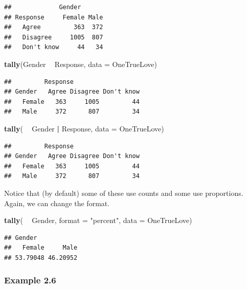 \documentclass[]{book}
\newenvironment{Shaded}{\begin{snugshade}}{\end{snugshade}}
\newcommand{\DataTypeTok}[1]{\textcolor[rgb]{0.13,0.29,0.53}{#1}}
\newcommand{\KeywordTok}[1]{\textcolor[rgb]{0.13,0.29,0.53}{\textbf{#1}}}
\newcommand{\NormalTok}[1]{#1}
\newcommand{\OperatorTok}[1]{\textcolor[rgb]{0.81,0.36,0.00}{\textbf{#1}}}
\newcommand{\StringTok}[1]{\textcolor[rgb]{0.31,0.60,0.02}{#1}}
\begin{document}
\begin{verbatim}
##             Gender
## Response     Female Male
##   Agree         363  372
##   Disagree     1005  807
##   Don't know     44   34
\end{verbatim}

\begin{Shaded}
\begin{Highlighting}[]
\KeywordTok{tally}\NormalTok{(Gender }\OperatorTok{~}\StringTok{ }\NormalTok{Response, }\DataTypeTok{data =}\NormalTok{ OneTrueLove)}
\end{Highlighting}
\end{Shaded}

\begin{verbatim}
##         Response
## Gender   Agree Disagree Don't know
##   Female   363     1005         44
##   Male     372      807         34
\end{verbatim}

\begin{Shaded}
\begin{Highlighting}[]
\KeywordTok{tally}\NormalTok{( }\OperatorTok{~}\StringTok{ }\NormalTok{Gender }\OperatorTok{|}\StringTok{ }\NormalTok{Response, }\DataTypeTok{data =}\NormalTok{ OneTrueLove)}
\end{Highlighting}
\end{Shaded}

\begin{verbatim}
##         Response
## Gender   Agree Disagree Don't know
##   Female   363     1005         44
##   Male     372      807         34
\end{verbatim}

Notice that (by default) some of these use counts and some use proportions. Again, we can change the format.

\begin{Shaded}
\begin{Highlighting}[]
\KeywordTok{tally}\NormalTok{( }\OperatorTok{~}\StringTok{ }\NormalTok{Gender, }\DataTypeTok{format =} \StringTok{"percent"}\NormalTok{, }\DataTypeTok{data =}\NormalTok{ OneTrueLove)}
\end{Highlighting}
\end{Shaded}

\begin{verbatim}
## Gender
##   Female     Male 
## 53.79048 46.20952
\end{verbatim}

\hypertarget{example-2.6}{%
\subsubsection{Example 2.6}\label{example-2.6}}
\end{document}
